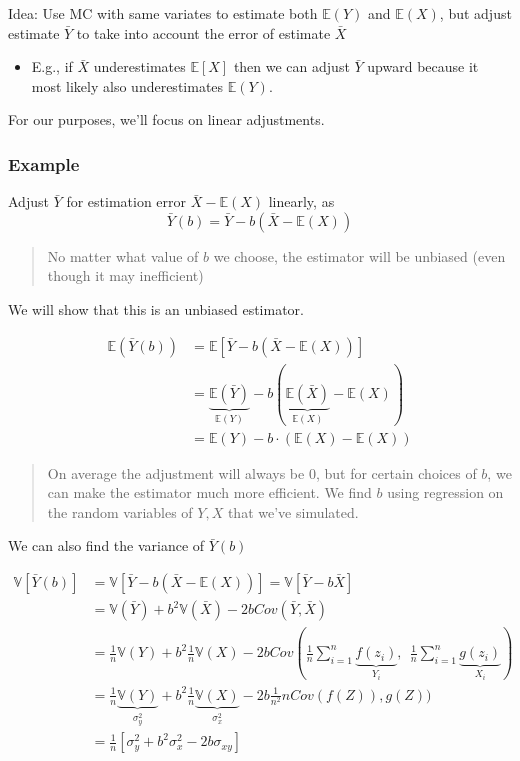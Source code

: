 \documentclass[
  oneside]{book}
\providecommand{\tightlist}{%
  \setlength{\itemsep}{0pt}\setlength{\parskip}{0pt}}
\begin{document}
Idea: Use MC with same variates to estimate both \(\mathbb{E}(Y)\) and \(\mathbb{E}(X)\), but adjust estimate \(\bar{Y}\) to take into account the error of estimate \(\bar{X}\)

\begin{itemize}
\tightlist
\item
  E.g., if \(\bar{X}\) underestimates \(\mathbb{E}[X]\) then we can adjust \(\bar{Y}\) upward because it most likely also underestimates \(\mathbb{E}(Y)\).
\end{itemize}

For our purposes, we'll focus on linear adjustments.

\hypertarget{example-5}{%
\subsubsection{Example}\label{example-5}}

Adjust \(\bar{Y}\) for estimation error \(\bar{X}-\mathbb{E}(X)\) linearly, as
\[
\bar{Y}(b) = \bar{Y}-b(\bar{X}-\mathbb{E}(X))
\]

\begin{quote}
No matter what value of \(b\) we choose, the estimator will be unbiased (even though it may inefficient)
\end{quote}

We will show that this is an unbiased estimator.

\[
\begin{aligned}
\mathbb{E}(\bar{Y}(b)) &= \mathbb{E}[\bar{Y}-b(\bar{X}-\mathbb{E}(X))]\\
&= \underbrace{ \mathbb{E}(\bar{Y}) }_{ \mathbb{E}(Y) } - b(\underbrace{ \mathbb{E}(\bar{X}) }_{ \mathbb{E}(X) }-\mathbb{E}(X))\\
&= \mathbb{E}(Y) - b\cdot(\mathbb{E}(X)-\mathbb{E}(X))
\end{aligned}
\]

\begin{quote}
On average the adjustment will always be 0, but for certain choices of \(b\), we can make the estimator much more efficient. We find \(b\) using regression on the random variables of \(Y,X\) that we've simulated.
\end{quote}

We can also find the variance of \(\bar{Y}(b)\)

\[
\begin{aligned}
\mathbb{V}[\bar{Y}(b)] &= \mathbb{V}[\bar{Y}-b(\bar{X}-\mathbb{E}(X))] = \mathbb{V}[\bar{Y}-b\bar{X}]\\
&= \mathbb{V}(\bar{Y}) + b^{2}\mathbb{V}(\bar{X})-2bCov(\bar{Y},\bar{X})\\
&= \frac{1}{n}\mathbb{V}(Y)+b^{2} \frac{1}{n}\mathbb{V}(X) - 2bCov\left( \frac{1}{n}\sum^{n}_{i=1}\underbrace{ f(z_{i}) }_{ Y_{i} },\ \ \frac{1}{n}\sum^{n}_{i=1}\underbrace{ g(z_{i}) }_{ X_{i} } \right)\\
&= \frac{1}{n}\underbrace{ \mathbb{V}(Y) }_{ \sigma^{2}_{y} }+b^{2}\frac{1}{n}\underbrace{ \mathbb{V}(X) }_{ \sigma^{2}_{x} }-2b \frac{1}{n^{2}}nCov(f(Z)), g(Z))\\
&= \frac{1}{n}\left[ \sigma^{2}_{y}+b^{2}\sigma^{2}_{x}-2b \sigma_{xy}\right]
\end{aligned}
\]
\end{document}
